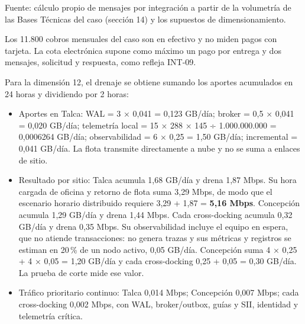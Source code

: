 \begin{anexohorizontal}
\nopagebreak
\par
{\fontsize{9pt}{11pt}\selectfont\raggedright Fuente: cálculo propio de mensajes por integración a partir de la volumetría de las Bases Técnicas del caso (sección 14) y los supuestos de dimensionamiento.\par}
\par
Los 11.800 cobros mensuales del caso son en efectivo y no miden pagos con tarjeta. La cota electrónica supone como máximo un pago por entrega y dos mensajes, solicitud y respuesta, como refleja INT-09.
\end{anexohorizontal}

Para la dimensión 12, el drenaje se obtiene sumando los aportes acumulados en 24 horas y dividiendo por 2 horas:

\begin{itemize}
  \item Aportes en Talca: WAL = 3 × 0,041 = 0,123 GB/día; broker = 0,5 × 0,041 = 0,020 GB/día; telemetría local = 15 × 288 × 145 ÷ 1.000.000.000 = 0,0006264 GB/día; observabilidad = 6 × 0,25 = 1,50 GB/día; incremental = 0,041 GB/día. La flota transmite directamente a nube y no se suma a enlaces de sitio.
  \item Resultado por sitio: Talca acumula 1,68 GB/día y drena 1,87 Mbps. Su hora cargada de oficina y retorno de flota suma 3,29 Mbps, de modo que el escenario horario distribuido requiere 3,29 + 1,87 = \textbf{5,16 Mbps}. Concepción acumula 1,29 GB/día y drena 1,44 Mbps. Cada cross-docking acumula 0,32 GB/día y drena 0,35 Mbps. Su observabilidad incluye el equipo en espera, que no atiende transacciones: no genera trazas y sus métricas y registros se estiman en 20\,\% de un nodo activo, 0,05 GB/día. Concepción suma 4 × 0,25 + 4 × 0,05 = 1,20 GB/día y cada cross-docking 0,25 + 0,05 = 0,30 GB/día. La prueba de corte mide ese valor.
  \item Tráfico prioritario continuo: Talca 0,014 Mbps; Concepción 0,007 Mbps; cada cross-docking 0,002 Mbps, con WAL, broker/outbox, guías y SII, identidad y telemetría crítica.
\end{itemize}

